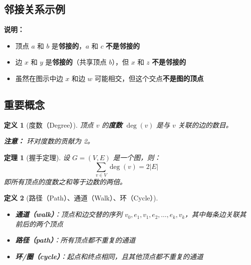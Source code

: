 \documentclass[12pt, a4paper]{article}
\newtheorem{definition}{定义}[section]
\newtheorem{theorem}{定理}[section]
\begin{document}
\subsection{邻接关系示例}

\begin{center}
\end{center}

\textbf{说明：}
\begin{itemize}
    \item 顶点 $a$ 和 $b$ 是\textbf{邻接的}，$a$ 和 $c$ \textbf{不是邻接的}
    \item 边 $x$ 和 $y$ 是\textbf{邻接的}（共享顶点 $b$），但 $x$ 和 $z$ \textbf{不是邻接的}
    \item 虽然在图示中边 $x$ 和边 $w$ 可能相交，但这个交点\textbf{不是图的顶点}
\end{itemize}


\subsection{重要概念}

\begin{definition}[度数（Degree）]
顶点 $v$ 的\textbf{度数} $\deg(v)$ 是与 $v$ 关联的边的数目。

\textbf{注意：} 环对度数的贡献为 2。
\end{definition}

\begin{theorem}[握手定理]
设 $G = (V, E)$ 是一个图，则：
\[
\sum_{v \in V} \deg(v) = 2|E|
\]
即所有顶点的度数之和等于边数的两倍。
\end{theorem}

\begin{definition}[路径（Path）、通道（Walk）、环（Cycle）]
\begin{itemize}
    \item \textbf{通道（walk）}：顶点和边交替的序列 $v_0, e_1, v_1, e_2, \dots, e_k, v_k$，其中每条边关联其前后的两个顶点
    \item \textbf{路径（path）}：所有顶点都不重复的通道
    \item \textbf{环/圈（cycle）}：起点和终点相同，且其他顶点都不重复的通道
\end{itemize}
\end{definition}
\end{document}
